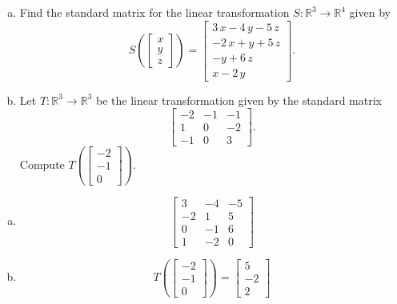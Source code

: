 
\begin{exerciseStatement}

\begin{enumerate}[(a)]
\item Find the standard matrix for the linear transformation \(S:\mathbb{R}^ 3  \to \mathbb{R}^ 4 \) given by \[S\left(  \left[\begin{array}{c}
x \\
y \\
z
\end{array}\right]  \right) =  \left[\begin{array}{c}
3 \, x - 4 \, y - 5 \, z \\
-2 \, x + y + 5 \, z \\
-y + 6 \, z \\
x - 2 \, y
\end{array}\right] .\]
\item Let \(T:\mathbb{R}^ 3  \to \mathbb{R}^ 3 \) be the linear transformation given by the standard matrix \[ \left[\begin{array}{ccc}
-2 & -1 & -1 \\
1 & 0 & -2 \\
-1 & 0 & 3
\end{array}\right] .\] Compute \(T\left( \left[\begin{array}{c}
-2 \\
-1 \\
0
\end{array}\right]  \right)\). 
\end{enumerate}
    
\end{exerciseStatement}
    
\begin{exerciseAnswer} 

\begin{enumerate}[(a)]
\item \[ \left[\begin{array}{ccc}
3 & -4 & -5 \\
-2 & 1 & 5 \\
0 & -1 & 6 \\
1 & -2 & 0
\end{array}\right] \]
\item \[T\left( \left[\begin{array}{c}
-2 \\
-1 \\
0
\end{array}\right]  \right)= \left[\begin{array}{c}
5 \\
-2 \\
2
\end{array}\right] \]
\end{enumerate}
    
\end{exerciseAnswer}
    
